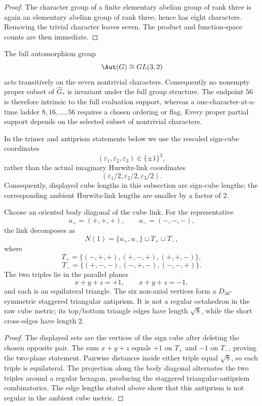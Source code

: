 \documentclass[11pt]{article}
\begin{document}
\begin{proof}
The character group of a finite elementary abelian group of rank three is again
an elementary abelian group of rank three, hence has eight characters.  Removing
the trivial character leaves seven.  The product and function-space counts are
then immediate.
\end{proof}

\begin{remark}
\label{p1:rem:walsh-flag-noncanonical}
The full automorphism group
\[
    \Aut(G)\cong GL(3,2)
\]
acts transitively on the seven nontrivial characters.  Consequently no
nonempty proper subset of \(\widehat G_*\) is invariant under the full group
structure.  The endpoint \(56\) is therefore intrinsic to the full evaluation
support, whereas a one-character-at-a-time ladder
\(8,16,\ldots,56\) requires a chosen ordering or flag.  Every proper partial
support depends on the selected subset of nontrivial characters.
\end{remark}

In the trimer and antiprism statements below we use the rescaled sign-cube coordinates
\[
(\varepsilon_1,\varepsilon_2,\varepsilon_3)\in\{\pm1\}^3,
\]
rather than the actual imaginary Hurwitz-link coordinates
\[
(\varepsilon_1/2,\varepsilon_2/2,\varepsilon_3/2).
\]
Consequently, displayed cube lengths in this subsection are sign-cube lengths; the corresponding ambient Hurwitz-link lengths are smaller by a factor of \(2\).

\begin{theorem}
\label{p1:thm:hurwitz-diagonal-trimer}
Choose an oriented body diagonal of the cube link.  For the representative
\[
    u_+=(+,+,+),\qquad u_-=(-,-,-),
\]
the link decomposes as
\[
    N(1)=\{u_+,u_-\}\sqcup T_+\sqcup T_-,
\]
where
\[
    T_+=\{(-,+,+),(+,-,+),(+,+,-)\},
\]
\[
    T_-=\{(+,-,-),(-,+,-),(-,-,+)\}.
\]
The two triples lie in the parallel planes
\[
    x+y+z=+1,
    \qquad
    x+y+z=-1,
\]
and each is an equilateral triangle.  The six non-axial vertices form a
\(D_{3d}\)-symmetric staggered triangular antiprism.  It is not a regular
octahedron in the raw cube metric; its top/bottom triangle edges have length
\(\sqrt8\), while the short cross-edges have length \(2\).
\end{theorem}

\begin{proof}
The displayed sets are the vertices of the sign cube after deleting the chosen
opposite pair.  The sum \(x+y+z\) equals \(+1\) on \(T_+\) and \(-1\) on
\(T_-\), proving the two-plane statement.  Pairwise distances inside either
triple equal \(\sqrt8\), so each triple is equilateral.  The projection along the
body diagonal alternates the two triples around a regular hexagon, producing the
staggered triangular-antiprism combinatorics.  The edge lengths stated above
show that this antiprism is not regular in the ambient cube metric.
\end{proof}
\end{document}
